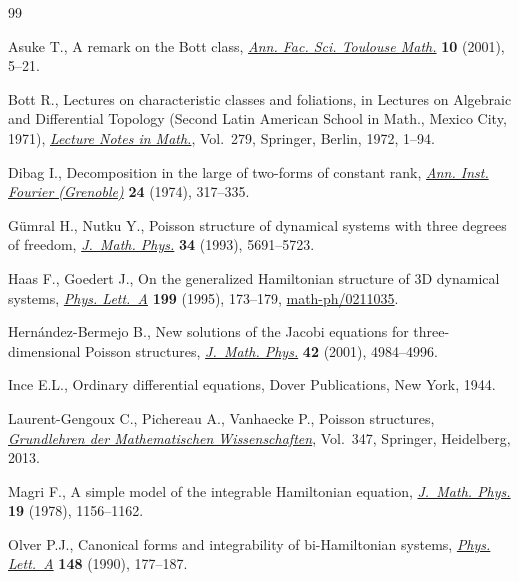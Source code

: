 \documentclass[pdftex]{sigma}
\numberwithin{equation}{section}
\begin{document}
\begin{thebibliography}{99}
\footnotesize\itemsep=0pt

Asuke T., A remark on the {B}ott class, \href{https://doi.org/10.5802/afst.981}{\textit{Ann. Fac. Sci. Toulouse Math.}}
 \textbf{10} (2001), 5--21.

Bott R., Lectures on characteristic classes and foliations, in Lectures on
 Algebraic and Dif\/ferential Topology ({S}econd {L}atin {A}merican {S}chool in
 {M}ath., {M}exico {C}ity, 1971), \href{https://doi.org/10.1007/BFb0058509}{\textit{Lecture Notes in Math.}}, Vol.~279,
 Springer, Berlin, 1972, 1--94.

Dibag I., Decomposition in the large of two-forms of constant rank,
 \href{https://doi.org/10.5802/aif.529}{\textit{Ann. Inst. Fourier (Grenoble)}} \textbf{24} (1974), 317--335.

G\"umral H., Nutku Y., Poisson structure of dynamical systems with three
 degrees of freedom, \href{https://doi.org/10.1063/1.530278}{\textit{J.~Math. Phys.}} \textbf{34} (1993), 5691--5723.

Haas F., Goedert J., On the generalized {H}amiltonian structure of {$3$}{D}
 dynamical systems, \href{https://doi.org/10.1016/0375-9601(95)00113-H}{\textit{Phys. Lett.~A}} \textbf{199} (1995), 173--179,
 \href{https://arxiv.org/abs/math-ph/0211035}{math-ph/0211035}.

Hern\'andez-Bermejo B., New solutions of the {J}acobi equations for
 three-dimensional {P}oisson structures, \href{https://doi.org/10.1063/1.1402174}{\textit{J.~Math. Phys.}} \textbf{42}
 (2001), 4984--4996.

Ince E.L., Ordinary dif\/ferential equations, Dover Publications, New York, 1944.

Laurent-Gengoux C., Pichereau A., Vanhaecke P., Poisson structures,
 \href{https://doi.org/10.1007/978-3-642-31090-4}{\textit{Grundlehren der Mathematischen Wissenschaften}}, Vol.~347, Springer,
 Heidelberg, 2013.

Magri F., A simple model of the integrable {H}amiltonian equation,
 \href{https://doi.org/10.1063/1.523777}{\textit{J.~Math. Phys.}} \textbf{19} (1978), 1156--1162.

Olver P.J., Canonical forms and integrability of bi-{H}amiltonian systems,
 \href{https://doi.org/10.1016/0375-9601(90)90775-J}{\textit{Phys. Lett.~A}} \textbf{148} (1990), 177--187.


\end{thebibliography}
\end{document}

